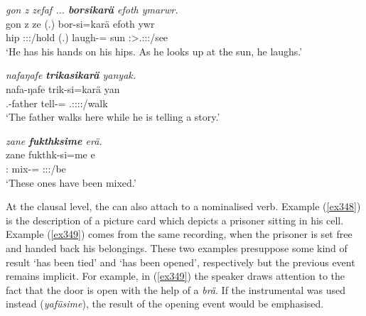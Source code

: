 \begin{exe}
	\ex \emph{gon z zefaf ... \textbf{borsikarä} efoth ymarwr.}\\
	\gll gon z ze (.) bor-si=karä efoth ywr\\
	hip {\Iam} \Fsg:\Sbj:\Rpst:\Pfv/hold (.) laugh-\Nmlz={\Prop} sun \Stsg:\Sbj>\Tsg.\Masc:\Obj:\Nonpast:\Ipfv/see\\ 
	\trans `He has his hands on his hips. As he looks up at the sun, he laughs.'\\
	\label{ex350}
\end{exe}
\begin{exe}
	\ex \emph{nafaŋafe \textbf{trikasikarä} yanyak.}\\
	\gll nafa-ŋafe trik-si=karä yan\\
	\Third.\Poss-father tell-\Nmlz={\Prop} \Tsg.\Masc:\Sbj:\Nonpast:\Ipfv:\Venit/walk\\
	\trans `The father walks here while he is telling a story.'
	\label{ex428}
\end{exe}
\begin{exe}
	\ex \emph{zane \textbf{fukthksime} erä.}\\
	\gll zane fukthk-si=me e\\
	\Dem:{\Prox} mix-\Nmlz={\Ins} \Stpl:\Sbj:\Nonpast:\Ipfv/be\\
	\trans `These ones have been mixed.'
	\label{ex427}
\end{exe}

At the clausal level, the  can also attach to a nominalised verb. Example (\ref{ex348}) is the description of a picture card which depicts a prisoner sitting in his cell. Example (\ref{ex349}) comes from the same recording, when the prisoner is set free and handed back his belongings. These two examples presuppose some kind of result \textendash{} `has been tied' and `has been opened', respectively \textendash{} but the previous event remains implicit. For example, in (\ref{ex349}) the speaker draws attention to the fact that the door is open with the help of a   \emph{brä}. If the instrumental  was used instead (\emph{yafüsime}), the result of the opening event would be emphasised.

